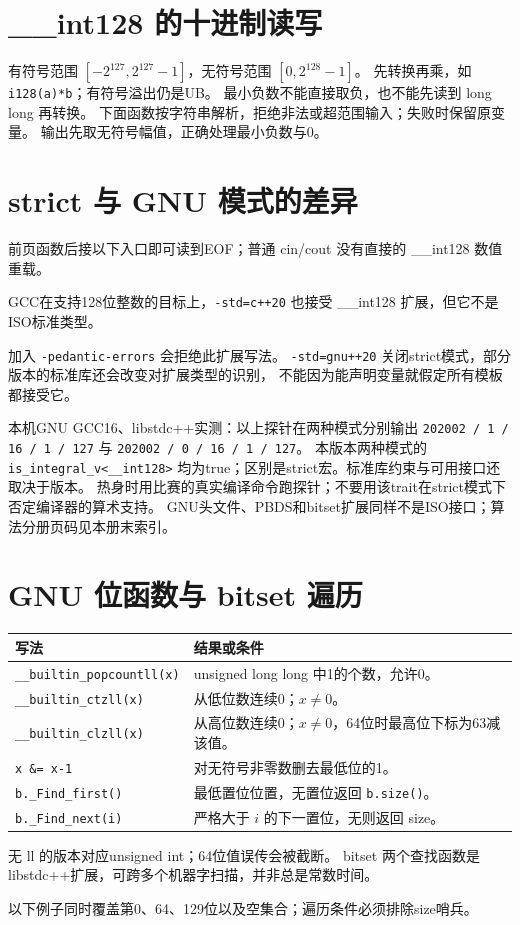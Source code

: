 \newpage
\section{\_\_int128 的十进制读写}
有符号范围 $[-2^{127},2^{127}-1]$，无符号范围 $[0,2^{128}-1]$。
先转换再乘，如 \texttt{i128(a)*b}；有符号溢出仍是UB。
最小负数不能直接取负，也不能先读到 long long 再转换。
下面函数按字符串解析，拒绝非法或超范围输入；失败时保留原变量。
输出先取无符号幅值，正确处理最小负数与0。


\newpage
\section{strict 与 GNU 模式的差异}
前页函数后接以下入口即可读到EOF；普通 cin/cout 没有直接的 \_\_int128 数值重载。

GCC在支持128位整数的目标上，\texttt{-std=c++20} 也接受 \_\_int128 扩展，但它不是ISO标准类型。

加入 \texttt{-pedantic-errors} 会拒绝此扩展写法。
\texttt{-std=gnu++20} 关闭strict模式，部分版本的标准库还会改变对扩展类型的识别，
不能因为能声明变量就假定所有模板都接受它。

本机GNU GCC16、libstdc++实测：以上探针在两种模式分别输出
\texttt{202002 / 1 / 16 / 1 / 127} 与 \texttt{202002 / 0 / 16 / 1 / 127}。
本版本两种模式的 \texttt{is\_integral\_v<\_\_int128>} 均为true；区别是strict宏。标准库约束与可用接口还取决于版本。
热身时用比赛的真实编译命令跑探针；不要用该trait在strict模式下否定编译器的算术支持。
GNU头文件、PBDS和bitset扩展同样不是ISO接口；算法分册页码见本册末索引。

\newpage
\section{GNU 位函数与 bitset 遍历}
\begin{longtable}{p{71mm}p{88mm}}\toprule 写法 & 结果或条件\\\midrule\endhead
\texttt{\_\_builtin\_popcountll(x)} & unsigned long long 中1的个数，允许0。\\
\texttt{\_\_builtin\_ctzll(x)} & 从低位数连续0；$x\ne0$。\\
\texttt{\_\_builtin\_clzll(x)} & 从高位数连续0；$x\ne0$，64位时最高位下标为63减该值。\\
\texttt{x \&= x-1} & 对无符号非零数删去最低位的1。\\
\texttt{b.\_Find\_first()} & 最低置位位置，无置位返回 \texttt{b.size()}。\\
\texttt{b.\_Find\_next(i)} & 严格大于 $i$ 的下一置位，无则返回 size。\\\bottomrule
\end{longtable}
无 ll 的版本对应unsigned int；64位值误传会被截断。
bitset 两个查找函数是libstdc++扩展，可跨多个机器字扫描，并非总是常数时间。

以下例子同时覆盖第0、64、129位以及空集合；遍历条件必须排除size哨兵。

